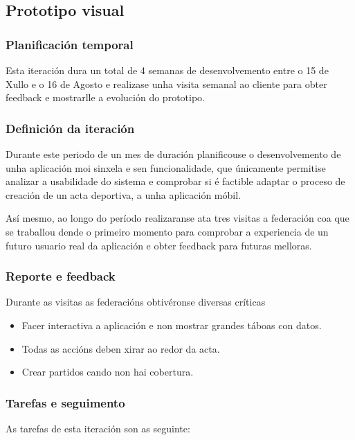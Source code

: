     \subsection{Prototipo visual}

      \subsubsection{Planificación temporal}
      Esta iteración dura un total de 4 semanas de desenvolvemento entre o 15 
de Xullo e o 16 de Agosto e realizase unha visita semanal ao cliente para obter 
feedback e mostrarlle a evolución do prototipo.

      \subsubsection{Definición da iteración}
      Durante este periodo de un mes de duración planificouse o desenvolvemento 
de unha aplicación moi sinxela e sen funcionalidade, que únicamente permitise 
analizar a usabilidade do sistema e comprobar si é factible adaptar o proceso 
de creación de un acta deportiva, a unha aplicación móbil.

    Así mesmo, ao longo do período realizaranse ata tres visitas a federación 
coa que se traballou dende o primeiro momento para comprobar a experiencia de 
un futuro usuario real da aplicación e obter feedback para futuras melloras.

      \subsubsection{Reporte e feedback}
      Durante as visitas as federacións obtivéronse diversas críticas 
      \begin{itemize}
        \item Facer interactiva a aplicación e non mostrar grandes táboas con 
datos.
        \item Todas as accións deben xirar ao redor da acta.
        \item Crear partidos cando non hai cobertura.
      \end{itemize}

      \subsubsection{Tarefas e seguimento}

      As tarefas de esta iteración son as seguinte:

